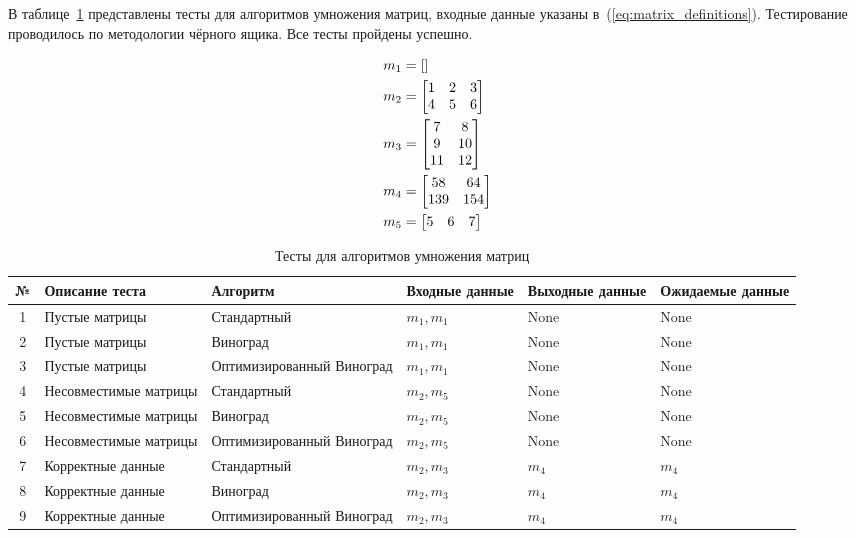 В таблице~\ref{table:matrix_tests} представлены тесты для алгоритмов умножения матриц, входные данные указаны в~(\ref{eq:matrix_definitions}). Тестирование проводилось по методологии чёрного ящика. Все тесты пройдены успешно.

\begin{align}
&m_1 = [] \\
&m_2 = \begin{bmatrix} 
1 & 2 & 3 \\ 
4 & 5 & 6 
\end{bmatrix} \notag \\
&m_3 = \begin{bmatrix} 
7 & 8 \\ 
9 & 10 \\ 
11 & 12 
\end{bmatrix} \notag \\
&m_4 = \begin{bmatrix} 
58 & 64 \\ 
139 & 154 
\end{bmatrix} \notag \\
&m_5 = \begin{bmatrix} 
5 & 6 & 7 
\end{bmatrix} \label{eq:matrix_definitions}
\end{align}



\begin{table}[htb]
\caption{\centering Тесты для алгоритмов умножения матриц}
\small
\centering\begin{tabular}{|c|p{3cm}|p{4cm}|p{2cm}|p{2cm}|p{2.1cm}|}
    \hline
    № & Описание теста & Алгоритм & Входные данные & Выходные данные & Ожидаемые данные \\ \hline
    1 & Пустые матрицы & Стандартный & $m_1, m_1$ & None & None \\ \hline
    2 & Пустые матрицы & Виноград & $m_1, m_1$ & None & None \\ \hline
    3 & Пустые матрицы & Оптимизированный Виноград & $m_1, m_1$ & None & None \\ \hline
    4 & Несовместимые матрицы & Стандартный & $m_2, m_5$ & None & None \\ \hline
    5 & Несовместимые матрицы & Виноград & $m_2, m_5$ & None & None \\ \hline
    6 & Несовместимые матрицы & Оптимизированный Виноград & $m_2, m_5$ & None & None
    \\ \hline
    7 & Корректные данные & Стандартный & $m_2, m_3$ & $m_4$ & $m_4$ \\ \hline
    8 & Корректные данные & Виноград & $m_2, m_3$ & $m_4$ & $m_4$ \\ \hline
    9 & Корректные данные & Оптимизированный Виноград & $m_2, m_3$ & $m_4$ & $m_4$ \\ \hline
\end{tabular}
\label{table:matrix_tests}
\end{table}

